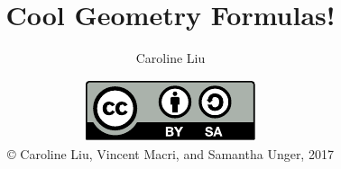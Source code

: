 


\usepackage{tikz}
\usepackage{tkz-euclide}
\usepackage{siunitx}


\title{Cool Geometry Formulas!}
\author{Caroline Liu}
\date{\includegraphics{../LicenseLogo}\\\copyright{} Caroline Liu, Vincent Macri, and Samantha Unger, 2017}


	\frame{\titlepage}
	
	

